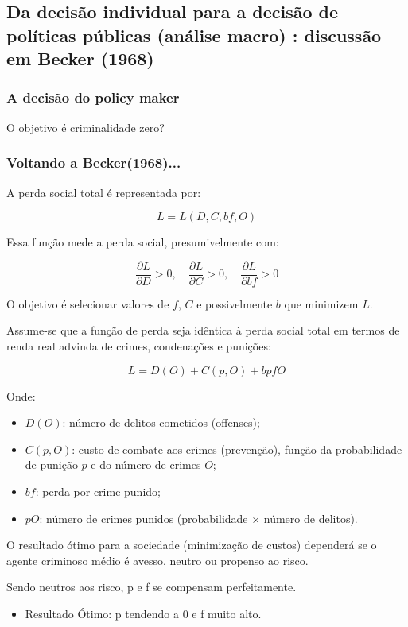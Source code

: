 \documentclass[a4paper,12pt]{article}[abntex2]
\begin{document}
\subsection{\textbf{Da decisão individual para a decisão de políticas públicas (análise macro) : discussão em Becker (1968)}}

\subsubsection{\textbf{A decisão do policy maker}}
O objetivo é criminalidade zero?

\subsubsection{\textbf{Voltando a Becker(1968)...}}
A perda social total é representada por:

\[
L = L(D, C, bf, O)
\]

Essa função mede a perda social, presumivelmente com:

\[
\frac{\partial L}{\partial D} > 0, \quad \frac{\partial L}{\partial C} > 0, \quad \frac{\partial L}{\partial bf} > 0
\]

O objetivo é selecionar valores de $f$, $C$ e possivelmente $b$ que minimizem $L$.

Assume-se que a função de perda seja idêntica à perda social total em termos de renda real advinda de crimes, condenações e punições:

\[
L = D(O) + C(p, O) + bpfO
\]

Onde:
\begin{itemize}
    \item $D(O)$: número de delitos cometidos (offenses);
    \item $C(p, O)$: custo de combate aos crimes (prevenção), função da probabilidade de punição $p$ e do número de crimes $O$;
    \item $bf$: perda por crime punido;
    \item $pO$: número de crimes punidos (probabilidade $\times$ número de delitos).
\end{itemize}

O resultado ótimo para a sociedade (minimização de custos) dependerá se o agente criminoso médio é avesso, neutro ou propenso ao risco.

Sendo neutros aos risco, p e f se compensam perfeitamente.\begin{itemize}
    \item Resultado Ótimo: p tendendo a 0 e f muito alto.
\end{itemize}
\end{document}
